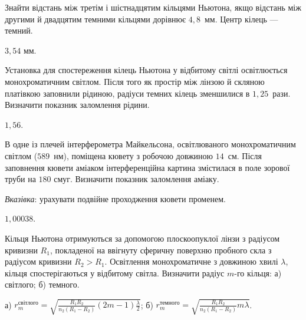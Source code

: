 \begin{problem}%
Знайти відстань між третім і шістнадцятим кільцями Ньютона, якщо
відстань між другими й двадцятим темними кільцями дорівнює $ 4,8 $~мм.
Центр кілець --- темний.
\begin{solution}
	$ 3,54 $ мм.
\end{solution}
\end{problem}


\begin{problem}%
Установка для спостереження кілець Ньютона у відбитому світлі
освітлюється монохроматичним світлом. Після того як простір між
лінзою й скляною платівкою заповнили рідиною, радіуси темних
кілець зменшилися в $ 1,25 $~рази. Визначити показник заломлення рідини.
\begin{solution}
	$ 1,56 $.
\end{solution}
\end{problem}



\begin{problem}%
В одне із плечей інтерферометра Майкельсона, освітлюваного
монохроматичним світлом ($ 589 $~нм), поміщена кювету з робочою
довжиною $ 14 $~см. Після заповнення кювети аміаком інтерференційна
картина змістилася в поле зорової труби на $ 180 $ смуг. Визначити
показник заломлення аміаку.

\medskip

\emph{Вказівка}: урахувати подвійне проходження кювети променем.
\begin{solution}
	$ 1,00038 $.
\end{solution}
\end{problem}



\begin{problem}%
Кільця Ньютона отримуються за допомогою плоскоопуклої лінзи з
радіусом кривизни $ R_1 $, покладеної на ввігнуту сферичну поверхню
пробного скла з радіусом кривизни $ R_2 > R_1 $. Освітлення
монохроматичне з довжиною хвилі $  \lambda $, кільця спостерігаються у
відбитому світла. Визначити радіус $ m $-го кільця: а) світлого; б) темного.
\begin{solution}
	а) $r_m^{\text{світлого}} = \sqrt{\frac{R_1R_2}{n_2(R_1 - R_2)} (2m-1)\frac\lambda2 }$; б)   $r_m^{\text{темного}} = \sqrt{\frac{R_1R_2}{n_2(R_1 - R_2)} m\lambda}$.
\end{solution}
\end{problem}


